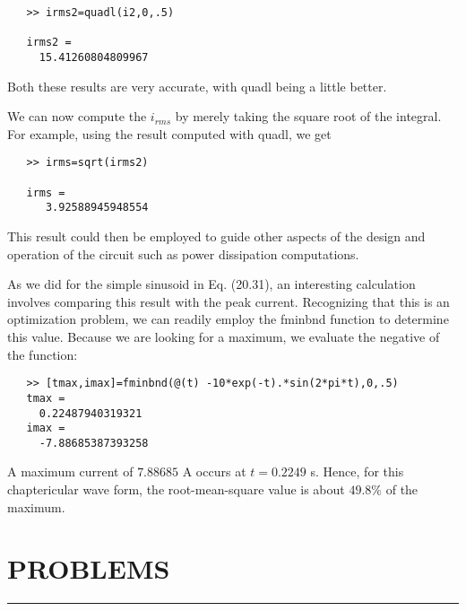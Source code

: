 \documentclass[../main.tex]{subfiles}
\begin{document}
\begin{verbatim}
   >> irms2=quadl(i2,0,.5)
   
   irms2 =
     15.41260804809967
\end{verbatim}
Both these results are very accurate, with quadl being a little better.

We can now compute the $i_{rms}$ by merely taking the square root of the integral. For example, using the result computed with quadl, we get

\begin{verbatim}
   >> irms=sqrt(irms2)
   
   irms =
      3.92588945948554
\end{verbatim}
This result could then be employed to guide other aspects of the design and operation of the
circuit such as power dissipation computations.

As we did for the simple sinusoid in Eq. (20.31), an interesting calculation involves
comparing this result with the peak current. Recognizing that this is an optimization problem, we can readily employ the fminbnd function to determine this value. Because we are
looking for a maximum, we evaluate the negative of the function:

\begin{verbatim}
   >> [tmax,imax]=fminbnd(@(t) -10*exp(-t).*sin(2*pi*t),0,.5)
   tmax =
     0.22487940319321
   imax =
     -7.88685387393258
\end{verbatim}
A maximum current of $7.88685$ A occurs at $t = 0.2249$ s. Hence, for this chaptericular wave
form, the root-mean-square value is about $49.8\%$ of the maximum.

\section*{PROBLEMS} \hrule
\end{document}
